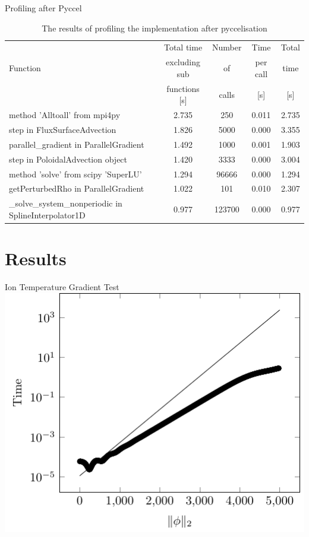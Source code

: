 \documentclass{beamer}
\begin{document}
\begin{frame}{Profiling after Pyccel}
\footnotesize
 \begin{table}[ht]
\centering
 \begin{tabular}{|m{}|c|c|c|c|}
  \hline
          & Total time & Number & Time & Total \\
  Function & excluding sub & of & per call & time \\
          & functions [s] & calls & [s] & [s] \\
  \hline
  \hline
  method 'Alltoall' from mpi4py & 2.735 & 250 & 0.011 & 2.735 \\
  \hline
  step in FluxSurfaceAdvection & 1.826 & 5000 & 0.000 & 3.355 \\
  \hline
  parallel\_gradient in ParallelGradient & 1.492 & 1000 & 0.001 & 1.903\\
  \hline
  step in PoloidalAdvection object & 1.420 & 3333 & 0.000 & 3.004\\
  \hline
  method 'solve' from scipy 'SuperLU' & 1.294 & 96666 & 0.000 & 1.294\\
  \hline
  getPerturbedRho in ParallelGradient & 1.022 & 101 & 0.010 & 2.307\\
  \hline
  \_solve\_system\_nonperiodic in SplineInterpolator1D & 0.977 & 123700 & 0.000 & 0.977\\
  \hline
 \end{tabular}
 \caption{\label{tab::final profile} The results of profiling the implementation after pyccelisation}
\end{table}
\end{frame}


\section{Results}

\begin{frame}{Ion Temperature Gradient Test}
 \includegraphics[width=.8\textwidth]{ITG/ITG}
\end{frame}
\end{document}
